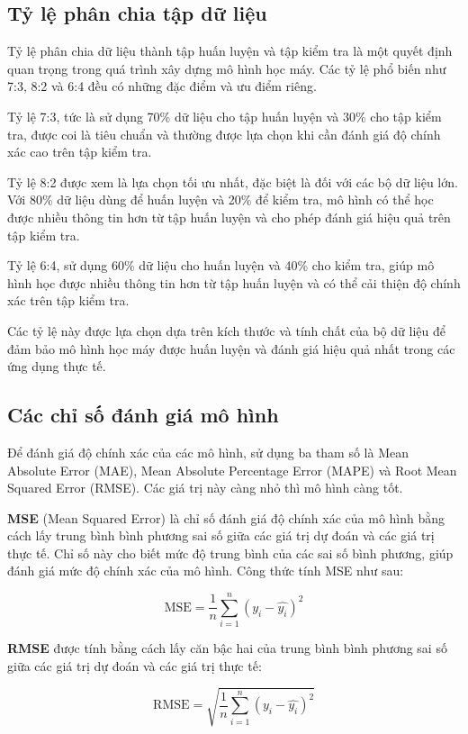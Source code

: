 \documentclass[conference]{IEEEtran}
\begin{document}
\subsection{Tỷ lệ phân chia tập dữ liệu}
Tỷ lệ phân chia dữ liệu thành tập huấn luyện và tập kiểm tra là một quyết định quan trọng trong quá trình xây dựng mô hình học máy. Các tỷ lệ phổ biến như 7:3, 8:2 và 6:4 đều có những đặc điểm và ưu điểm riêng.

Tỷ lệ 7:3, tức là sử dụng 70\% dữ liệu cho tập huấn luyện và 30\% cho tập kiểm tra, được coi là tiêu chuẩn và thường được lựa chọn khi cần đánh giá độ chính xác cao trên tập kiểm tra.

Tỷ lệ 8:2 được xem là lựa chọn tối ưu nhất, đặc biệt là đối với các bộ dữ liệu lớn. Với 80\% dữ liệu dùng để huấn luyện và 20\% để kiểm tra, mô hình có thể học được nhiều thông tin hơn từ tập huấn luyện và cho phép đánh giá hiệu quả trên tập kiểm tra.

Tỷ lệ 6:4, sử dụng 60\% dữ liệu cho huấn luyện và 40\% cho kiểm tra, giúp mô hình học được nhiều thông tin hơn từ tập huấn luyện và có thể cải thiện độ chính xác trên tập kiểm tra.

Các tỷ lệ này được lựa chọn dựa trên kích thước và tính chất của bộ dữ liệu để đảm bảo mô hình học máy được huấn luyện và đánh giá hiệu quả nhất trong các ứng dụng thực tế.
\subsection{Các chỉ số đánh giá mô hình}
Để đánh giá độ chính xác của các mô hình, sử dụng ba tham số là Mean Absolute Error (MAE), Mean Absolute Percentage Error (MAPE) và Root Mean Squared Error (RMSE). Các giá trị này càng nhỏ thì mô hình càng tốt.

\textbf{MSE} (Mean Squared Error) là chỉ số đánh giá độ chính xác của mô hình bằng cách lấy trung bình bình phương sai số giữa các giá trị dự đoán và các giá trị thực tế. Chỉ số này cho biết mức độ trung bình của các sai số bình phương, giúp đánh giá mức độ chính xác của mô hình. Công thức tính MSE như sau:

\begin{equation}
    \text{MSE} = \frac{1}{n} \sum_{i=1}^{n} (y_i - \hat{y_i})^2
\end{equation}

\textbf{RMSE} được tính bằng cách lấy căn bậc hai của trung bình bình phương sai số giữa các giá trị dự đoán và các giá trị thực tế:

\begin{equation}
    \text{RMSE} = \sqrt{\frac{1}{n} \sum_{i=1}^{n} (y_i - \hat{y_i})^2}
\end{equation}
\end{document}
